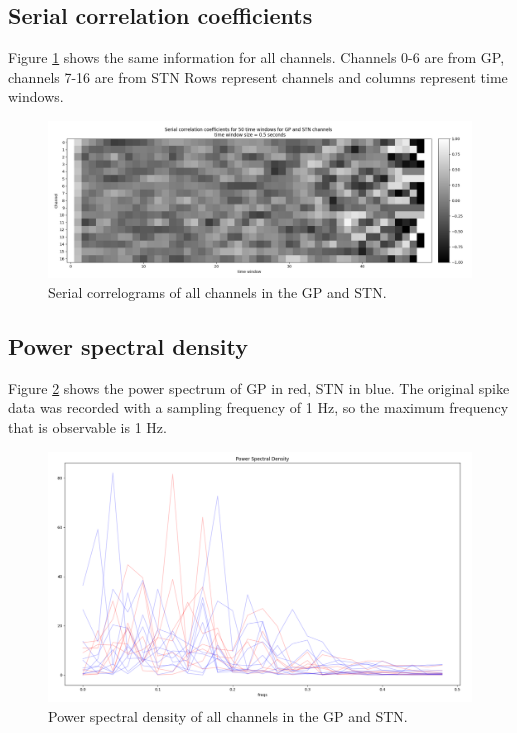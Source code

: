 \documentclass{kththesis}
\begin{document}
\subsection{Serial correlation coefficients}

Figure \ref{fig:corr3} shows the same information for all channels. Channels 0-6 are from GP, channels 7-16 are from STN
Rows represent channels and columns represent time windows.

\begin{figure}[H]
    \centering
    \centerline{\includegraphics[width=1\textwidth]{images/spiking/autocorr_all.png}}
    \caption{Serial correlograms of all channels in the GP and STN.}
    \label{fig:corr3}
\end{figure}

\subsection{Power spectral density}

Figure \ref{fig:PS3} shows the power spectrum of GP in red, STN in blue.
The original spike data was recorded with a sampling frequency of 1 Hz, so the maximum frequency that is observable is 1 Hz.

\begin{figure}[H]
    \centering
    \centerline{\includegraphics[width=1\textwidth]{images/spiking/powerSpect_all.png}}
    \caption{Power spectral density of all channels in the GP and STN.}
    \label{fig:PS3}
\end{figure}
\end{document}
